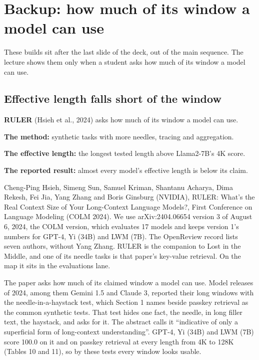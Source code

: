 \section{Backup: how much of its window a model can use}
\label{sec:backup}

These builds sit after the last slide of the deck, out of the main sequence. The lecture shows them only when a student asks how much of its window a model can use.

\subsection{Effective length falls short of the window}
\label{sec:it-B-6-2}

\bi
\item \textbf{RULER} (Hsieh et al., 2024) asks how much of its window a model can use.
\item \textbf{The method:} synthetic tasks with more needles, tracing and aggregation.
\item \textbf{The effective length:} the longest tested length above Llama2-7B's 4K score.
\item \textbf{The reported result:} almost every model's effective length is below its claim.
\ei

Cheng-Ping Hsieh, Simeng Sun, Samuel Kriman, Shantanu Acharya, Dima Rekesh, Fei Jia, Yang Zhang and Boris Ginsburg (NVIDIA), RULER: What's the Real Context Size of Your Long-Context Language Models?, First Conference on Language Modeling (COLM 2024). We use arXiv:2404.06654 version 3 of August 6, 2024, the COLM version, which evaluates 17 models and keeps version 1's numbers for GPT-4, Yi (34B) and LWM (7B). The OpenReview record lists seven authors, without Yang Zhang. RULER is the companion to Lost in the Middle, and one of its needle tasks is that paper's key-value retrieval. On the map it sits in the evaluations lane.

The paper asks how much of its claimed window a model can use. Model releases of 2024, among them Gemini 1.5 and Claude 3, reported their long windows with the needle-in-a-haystack test, which Section 1 names beside passkey retrieval as the common synthetic tests. That test hides one fact, the needle, in long filler text, the haystack, and asks for it. The abstract calls it ``indicative of only a superficial form of long-context understanding''. GPT-4, Yi (34B) and LWM (7B) score 100.0 on it and on passkey retrieval at every length from 4K to 128K (Tables 10 and 11), so by these tests every window looks usable.

